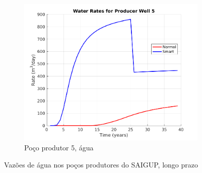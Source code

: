 \begin{figure}[!ht]
	\begin{subfigure}[b]{.45\textwidth}
		\includegraphics[width=\textwidth]{figs/resultadosLSAIGUP/LSAIGUP_WaterWell5_Zoom}
		\caption{Po\c{c}o produtor 5, \'{a}gua}
		\label{LSAIGUP_WaterWell5}
	\end{subfigure}
	\caption{Vaz\~{o}es de \'{a}gua nos po\c{c}os produtores do SAIGUP, longo prazo}
	\label{LSAIGUP_WaterRates}
\end{figure}